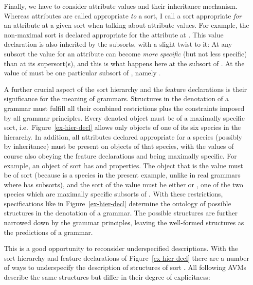 \documentclass[output=paper
                ,modfonts
                ,nonflat
	        ,collection
	        ,collectionchapter
	        ,collectiontoclongg
 	        ,biblatex
                ,babelshorthands
                ,newtxmath
                ,draftmode
                ,colorlinks, citecolor=brown
]{./langsci/langscibook}
\begin{document}
{Finally, we have to consider attribute values and their inheritance
mechanism. Whereas attributes are called appropriate \emph{to} a sort,
I call a sort appropriate \emph{for} an attribute at a given sort when
talking about attribute values. For example, the non-maximal sort
 is declared appropriate for the attribute 
at . This value declaration is also inherited by the
subsorts, with a slight twist to it: At any subsort the value for an
attribute can become \emph{more specific} (but not less specific) than
at its supersort(s), and this is what happens here at the subsort
 of .  At  the value of
 must be one particular subsort of , namely
.

A further crucial aspect of the sort hierarchy and the feature
declarations is their significance for the meaning of
grammars. Structures in the denotation of a grammar must fulfill all
their combined restrictions plus the constraints imposed by all
grammar principles. Every denoted object must be of a maximally
specific sort, i.e.\ Figure~\ref{ex-hier-decl} allows only objects of
one of its six species in the hierarchy. In addition, all attributes
declared appropriate for a species (possibly by inheritance) must be
present on objects of that species, with the values of course also
obeying the feature declarations and being maximally specific. For
example, an object of sort  has  and
 properties. The object that is the  value
must be of sort  (because  is a species in the
present example, unlike in real grammars where  has
subsorts), and the sort of the  value must be either
 or , one of the two species which are
maximally specific subsorts of .  With these
restrictions, specifications like in Figure~\ref{ex-hier-decl} determine
the ontology of possible structures in the denotation of a
grammar. The possible structures are further narrowed down by the
grammar principles, leaving the well-formed structures as the
predictions of a grammar.

This is a good opportunity to reconsider underspecified descriptions.
With the sort hierarchy and feature declarations of Figure~\ref{ex-hier-decl}
there are a number of ways to underspecify the description of structures
of sort . All following AVMs describe the same structures
but differ in their degree of explicitness:

}
\end{document}
